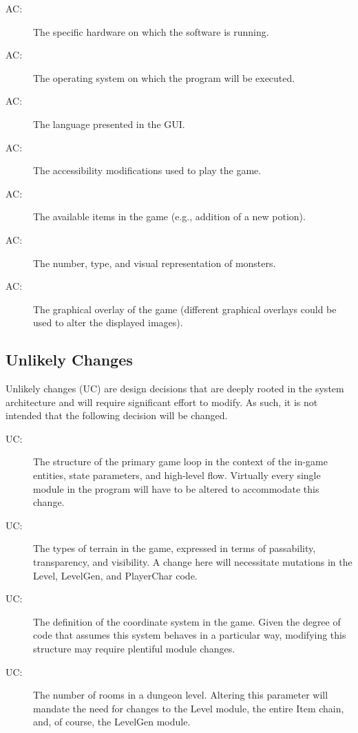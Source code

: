 \documentclass[12pt, titlepage]{article}
\newcounter{acnum}
\newcommand{\actheacnum}{AC\theacnum}
\newcounter{ucnum}
\newcommand{\uctheucnum}{UC\theucnum}
\begin{document}
        \bigskip\begin{description}
            \item[ \actheacnum \label{acHardware}:] The specific hardware on which the software is running.
            \item[ \actheacnum \label{acOs}:] The operating system on which the program will be executed.
            \item[ \actheacnum \label{acLanguage}:] The language presented in the GUI.
            \item[ \actheacnum \label{acAccessibility}:] The accessibility modifications used to play the game.
            \item[ \actheacnum \label{acItems}:] The available items in the game (e.g., addition of a new potion).
            \item[ \actheacnum \label{acMonsters}:] The number, type, and visual representation of monsters.
            \item[ \actheacnum \label{acVisuals}:] The graphical overlay of the game (different graphical overlays could be used to alter the displayed images).
        \end{description}

    \subsection{Unlikely Changes} \label{SecUchange}

        Unlikely changes (UC) are design decisions that are deeply rooted in the system architecture and will require significant effort to modify.  As such, it is not intended that the following decision will be changed.

        \bigskip\begin{description}
            \item[ \uctheucnum \label{ucMasterCtrl}:] The structure of the primary game loop in the context of the in-game entities, state parameters, and high-level flow.  Virtually every single module in the program will have to be altered to accommodate this change.
            \item[ \uctheucnum \label{ucTerrain}:] The types of terrain in the game, expressed in terms of passability, transparency, and visibility. A change here will necessitate mutations in the Level, LevelGen, and PlayerChar code.
            \item[ \uctheucnum \label{ucCoord}:] The definition of the coordinate system in the game.  Given the degree of code that assumes this system behaves in a particular way, modifying this structure may require plentiful module changes.
            \item[ \uctheucnum \label{ucRooms}:] The number of rooms in a dungeon level.  Altering this parameter will mandate the need for changes to the Level module, the entire Item chain, and, of course, the LevelGen module.
        \end{description}
\end{document}
